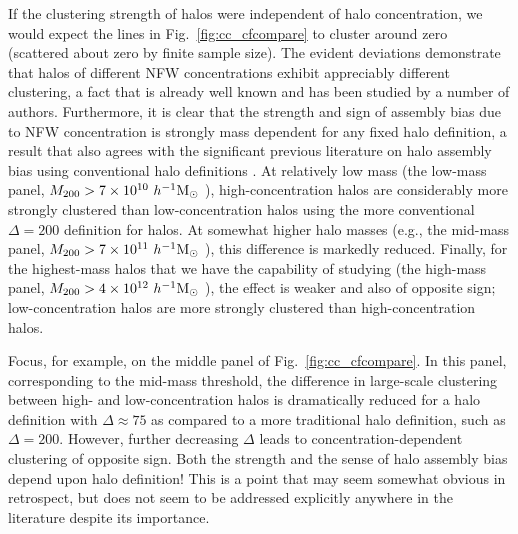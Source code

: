 \documentclass[usenatbib]{mnras}
\begin{document}
If the clustering strength of halos were independent of halo concentration, we 
would expect the lines in Fig.~\ref{fig:cc_cfcompare} to cluster around zero (scattered about zero by finite sample size). 
The evident deviations demonstrate that halos of different NFW concentrations exhibit appreciably 
different clustering, a fact that is already well known and has been studied by a number of authors. 
Furthermore, it is clear that the strength and sign of assembly bias due to NFW concentration is 
strongly mass dependent for any fixed halo definition, a result that also agrees with the significant 
previous literature on halo assembly bias using conventional halo definitions 
\citep{wechsler_etal02, gao_etal05, zentner07, wechsler_etal06, harker_etal06, croton_etal07, dalal_etal08, mao_etal15, sunayama_etal16}.
At relatively low mass (the low-mass panel, $M_{200} > 7 \times 10^{10} \ h^{-1}\mathrm{M}_{\odot}~$), 
high-concentration halos are considerably more strongly clustered than low-concentration halos using the more 
conventional $\Delta = 200$ definition for halos. At somewhat higher halo masses 
(e.g., the mid-mass panel, $M_{200} > 7 \times 10^{11} \ h^{-1}\mathrm{M}_{\odot}~$), this difference is markedly reduced. 
Finally, for the highest-mass halos that we have the capability of studying (the high-mass panel, 
$M_{200} > 4 \times 10^{12} \ h^{-1}\mathrm{M}_{\odot}~$), the effect is weaker and also of opposite sign; 
low-concentration halos are more strongly clustered than high-concentration halos.


Focus, for example, on the middle panel of Fig.~\ref{fig:cc_cfcompare}. In this panel, 
corresponding to the mid-mass threshold, the difference in large-scale clustering between 
high- and low-concentration halos is dramatically reduced for a halo definition with 
$\Delta \approx 75$ as compared to a more traditional halo definition, such as $\Delta=200$. 
However, further decreasing $\Delta$ leads to concentration-dependent clustering of opposite sign. 
Both the strength and the sense of halo assembly bias depend upon halo definition! This is a 
point that may seem somewhat obvious in retrospect, but does not seem to be addressed 
explicitly anywhere in the literature despite its importance.
\end{document}
